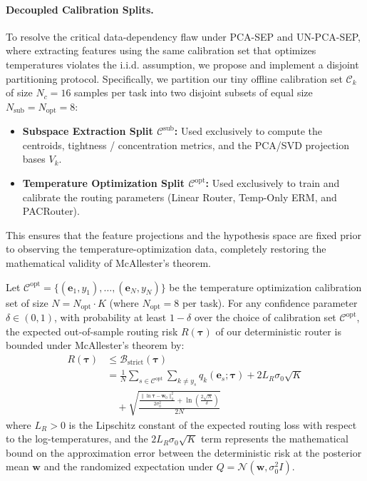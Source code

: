 \paragraph{Decoupled Calibration Splits.} To resolve the critical data-dependency flaw under PCA-SEP and UN-PCA-SEP, where extracting features using the same calibration set that optimizes temperatures violates the i.i.d. assumption, we propose and implement a disjoint partitioning protocol. Specifically, we partition our tiny offline calibration set $\mathcal{C}_k$ of size $N_c = 16$ samples per task into two disjoint subsets of equal size $N_{\text{sub}} = N_{\text{opt}} = 8$:
\begin{itemize}
    \item \textbf{Subspace Extraction Split $\mathcal{C}^{\text{sub}}$:} Used exclusively to compute the centroids, tightness / concentration metrics, and the PCA/SVD projection bases $V_k$.
    \item \textbf{Temperature Optimization Split $\mathcal{C}^{\text{opt}}$:} Used exclusively to train and calibrate the routing parameters (Linear Router, Temp-Only ERM, and PACRouter).
\end{itemize}
This ensures that the feature projections and the hypothesis space are fixed prior to observing the temperature-optimization data, completely restoring the mathematical validity of McAllester's theorem.

Let $\mathcal{C}^{\text{opt}} = \{(\mathbf{e}_1, y_1), \dots, (\mathbf{e}_N, y_N)\}$ be the temperature optimization calibration set of size $N = N_{\text{opt}} \cdot K$ (where $N_{\text{opt}} = 8$ per task). For any confidence parameter $\delta \in (0, 1)$, with probability at least $1 - \delta$ over the choice of calibration set $\mathcal{C}^{\text{opt}}$, the expected out-of-sample routing risk $R(\boldsymbol{\tau})$ of our deterministic router is bounded under McAllester's theorem by:
\begin{align}
    R(\boldsymbol{\tau}) &\le \mathcal{B}_{\text{strict}}(\boldsymbol{\tau}) \nonumber \\
    &= \frac{1}{N} \sum_{s \in \mathcal{C}^{\text{opt}}} \sum_{k \ne y_s} q_k(\mathbf{e}_s; \boldsymbol{\tau}) + 2 L_R \sigma_0 \sqrt{K} \nonumber \\
    &\quad + \sqrt{\frac{\frac{\|\ln \boldsymbol{\tau} - \mathbf{w}_0\|_2^2}{2 \sigma_0^2} + \ln\left(\frac{2\sqrt{N}}{\delta}\right)}{2N}}
\label{eq:pac_bound_strict}
\end{align}
where $L_R > 0$ is the Lipschitz constant of the expected routing loss with respect to the log-temperatures, and the $2 L_R \sigma_0 \sqrt{K}$ term represents the mathematical bound on the approximation error between the deterministic risk at the posterior mean $\mathbf{w}$ and the randomized expectation under $Q = \mathcal{N}(\mathbf{w}, \sigma_0^2 I)$.


